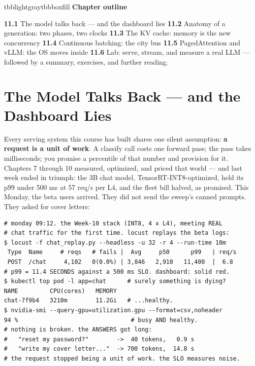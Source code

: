 \vspace{2.5pt}

\begin{calloutbox}{tbblightgray}{tbbboxfill}
{\normalsize\bfseries\color{tbbink}Chapter outline}\par\vspace{3pt}
\textbf{11.1} The model talks back — and the dashboard lies    \textbf{11.2} Anatomy of a generation: two phases, two clocks    \textbf{11.3} The KV cache: memory is the new concurrency    \textbf{11.4} Continuous batching: the city bus    \textbf{11.5} PagedAttention and vLLM: the OS moves inside    \textbf{11.6} Lab: serve, stream, and measure a real LLM — followed by a summary, exercises, and further reading.
\end{calloutbox}

\section{The Model Talks Back — and the Dashboard Lies}

Every serving system this course has built shares one silent assumption: \textbf{a request is a unit of work}. A classify call costs one forward pass; the pass takes milliseconds; you promise a percentile of that number and provision for it. Chapters 7 through 10 measured, optimized, and priced that world — and last week ended in triumph: the 3B chat model, TensorRT-INT8-optimized, held its p99 under 500 ms at 57 req/s per L4, and the fleet bill halved, as promised. This Monday, the beta users arrived. They did not send the sweep's canned prompts. They asked for cover letters:

\begin{terminalbox}
\begin{Verbatim}[breaklines=true,breakanywhere=true,fontsize=\small,formatcom=\color{tbbtermfg},codes=\tbbcodeactive]
# monday 09:12. the Week-10 stack (INT8, 4 x L4), meeting REAL
# chat traffic for the first time. locust replays the beta logs:
$ locust -f chat_replay.py --headless -u 32 -r 4 --run-time 10m
 Type  Name     # reqs   # fails |  Avg     p50      p99   | req/s
 POST  /chat     4,102   0(0.0%) | 3,846   2,910   11,400  |  6.8
# p99 = 11.4 SECONDS against a 500 ms SLO. dashboard: solid red.
$ kubectl top pod -l app=chat      # surely something is dying?
NAME         CPU(cores)   MEMORY
chat-7f9b4   3210m        11.2Gi   # ...healthy.
$ nvidia-smi --query-gpu=utilization.gpu --format=csv,noheader
94 %                                # busy AND healthy.
# nothing is broken. the ANSWERS got long:
#   "reset my password?"        ->  40 tokens,   0.9 s
#   "write my cover letter..."  -> 700 tokens,  14.8 s
# the request stopped being a unit of work. the SLO measures noise.
\end{Verbatim}
\end{terminalbox}

